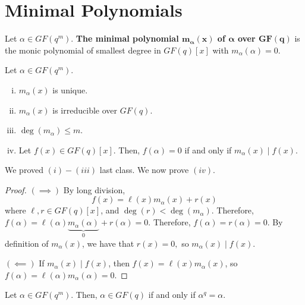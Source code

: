 \section{Minimal Polynomials}
\begin{defbox}
    \begin{definition}
        Let $ \alpha\in GF(q^m) $. \textbf{The minimal polynomial
            $\bm{m_\alpha(x)} $ of $ \bm{\alpha} $ over $ \bm{GF(q)} $} is
        the monic polynomial of smallest degree in $ GF(q)[x] $ with
        $ m_\alpha(\alpha)=0 $.
    \end{definition}
\end{defbox}

\begin{thmbox}
    \begin{theorem}
        Let $ \alpha\in GF(q^m) $.
        \begin{enumerate}[(i)]
            \item $ m_\alpha(x) $ is unique.
            \item $ m_\alpha(x) $ is irreducible over $ GF(q) $.
            \item $ \deg(m_\alpha)\leqslant m $.
            \item Let $ f(x)\in GF(q)[x] $. Then, $ f(\alpha)=0 $ if and only
                  if $ m_\alpha(x)\mid f(x) $.
        \end{enumerate}
    \end{theorem}
\end{thmbox}
We proved $ (i)-(iii) $ last class. We now prove $ (iv) $.
\begin{proof}
    $ (\implies) $
    By long division,
    \[ f(x)=\ell(x)m_\alpha(x)+r(x) \]
    where $ \ell,r\in GF(q)[x] $, and $ \deg(r)<\deg(m_\alpha) $.
    Therefore, $ f(\alpha)=\ell(\alpha)\underbrace{m_\alpha(\alpha)}_{0}+r(\alpha)=0 $.
    Therefore, $ f(\alpha)=r(\alpha)=0 $. By definition of $ m_\alpha(x) $,
    we have that $ r(x)=0, $ so $ m_\alpha(x)\mid f(x) $.

    $ (\impliedby) $ If $ m_\alpha(x)\mid f(x) $, then $ f(x)=\ell(x)m_\alpha(x) $,
    so $ f(\alpha)=\ell(\alpha)m_\alpha(\alpha)=0 $.
\end{proof}

\begin{thmbox}
    \begin{theorem}
        Let $ \alpha\in GF(q^m) $. Then, $ \alpha\in GF(q) $ if and only if
        $ \alpha^q=\alpha $.
    \end{theorem}
\end{thmbox}

